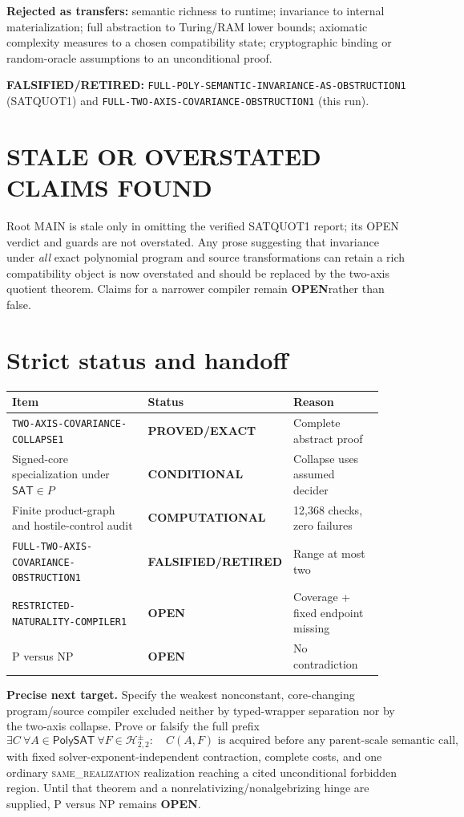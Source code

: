 \documentclass[11pt]{article}
\newcommand{\SAT}{\mathsf{SAT}}
\newcommand{\PolySAT}{\mathsf{PolySAT}}
\newcommand{\Hsigned}{\mathcal H^{\pm}_{2,2}}
\newcommand{\EXACT}{\textbf{PROVED/EXACT}}
\newcommand{\COMP}{\textbf{COMPUTATIONAL}}
\newcommand{\COND}{\textbf{CONDITIONAL}}
\newcommand{\OPEN}{\textbf{OPEN}}
\newcommand{\RETIRED}{\textbf{FALSIFIED/RETIRED}}
\newcommand{\same}{\textsc{same\_realization}}
\begin{document}
\textbf{Rejected as transfers:} semantic richness to runtime; invariance to
internal materialization; full abstraction to Turing/RAM lower bounds;
axiomatic complexity measures to a chosen compatibility state; cryptographic
binding or random-oracle assumptions to an unconditional proof.

\textbf{FALSIFIED/RETIRED:}
\texttt{FULL-POLY-SEMANTIC-INVARIANCE-AS-OBSTRUCTION1} (SATQUOT1) and
\texttt{FULL-TWO-AXIS-COVARIANCE-OBSTRUCTION1} (this run).

\section{STALE OR OVERSTATED CLAIMS FOUND}

Root MAIN is stale only in omitting the verified SATQUOT1 report; its OPEN
verdict and guards are not overstated.  Any prose suggesting that invariance
under \emph{all} exact polynomial program and source transformations can
retain a rich compatibility object is now overstated and should be replaced
by the two-axis quotient theorem.  Claims for a narrower compiler remain
\OPEN rather than false.

\section{Strict status and handoff}

\begin{center}
\begin{tabular}{p{0.47\linewidth}p{0.18\linewidth}p{0.27\linewidth}}
\toprule
Item & Status & Reason\\ \midrule
\texttt{TWO-AXIS-COVARIANCE-COLLAPSE1} & \EXACT & Complete abstract proof\\
Signed-core specialization under $\SAT\in P$ & \COND & Collapse uses assumed decider\\
Finite product-graph and hostile-control audit & \COMP & 12,368 checks, zero failures\\
\texttt{FULL-TWO-AXIS-COVARIANCE-OBSTRUCTION1} & \RETIRED & Range at most two\\
\texttt{RESTRICTED-NATURALITY-COMPILER1} & \OPEN & Coverage + fixed endpoint missing\\
P versus NP & \OPEN & No contradiction\\ \bottomrule
\end{tabular}
\end{center}

\textbf{Precise next target.}  Specify the weakest nonconstant, core-changing
program/source compiler excluded neither by typed-wrapper separation nor by
the two-axis collapse.  Prove or falsify the full prefix
\[
 \exists C\ \forall A\in\PolySAT\ \forall F\in\Hsigned:
 \quad C(A,F)\text{ is acquired before any parent-scale semantic call,}
\]
with fixed solver-exponent-independent contraction, complete costs, and one
ordinary \same{} realization reaching a cited unconditional forbidden region.
Until that theorem and a nonrelativizing/nonalgebrizing hinge are supplied, P
versus NP remains \OPEN.
\end{document}
